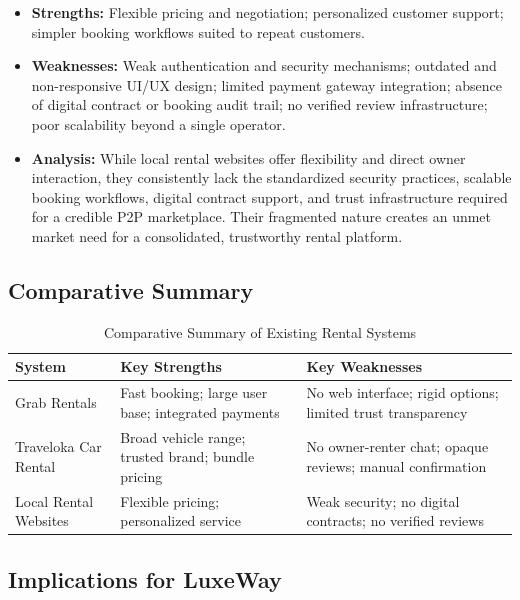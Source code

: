 \begin{itemize}
    \item \textbf{Strengths:} Flexible pricing and negotiation; personalized customer support; simpler booking workflows suited to repeat customers.

    \item \textbf{Weaknesses:} Weak authentication and security mechanisms; outdated and non-responsive UI/UX design; limited payment gateway integration; absence of digital contract or booking audit trail; no verified review infrastructure; poor scalability beyond a single operator.

    \item \textbf{Analysis:} While local rental websites offer flexibility and direct owner interaction, they consistently lack the standardized security practices, scalable booking workflows, digital contract support, and trust infrastructure required for a credible P2P marketplace. Their fragmented nature creates an unmet market need for a consolidated, trustworthy rental platform.
\end{itemize}

\subsection{Comparative Summary}

\begin{table}[ht]
\centering
\caption{Comparative Summary of Existing Rental Systems}
\label{tab:existing_systems}
\begin{tabular}{p{3.2cm} p{6cm} p{6cm}}
\toprule
\textbf{System} & \textbf{Key Strengths} & \textbf{Key Weaknesses} \\
\midrule
Grab Rentals & Fast booking; large user base; integrated payments & No web interface; rigid options; limited trust transparency \\
Traveloka Car Rental & Broad vehicle range; trusted brand; bundle pricing & No owner-renter chat; opaque reviews; manual confirmation \\
Local Rental Websites & Flexible pricing; personalized service & Weak security; no digital contracts; no verified reviews \\
\bottomrule
\end{tabular}
\end{table}

\subsection{Implications for LuxeWay}

